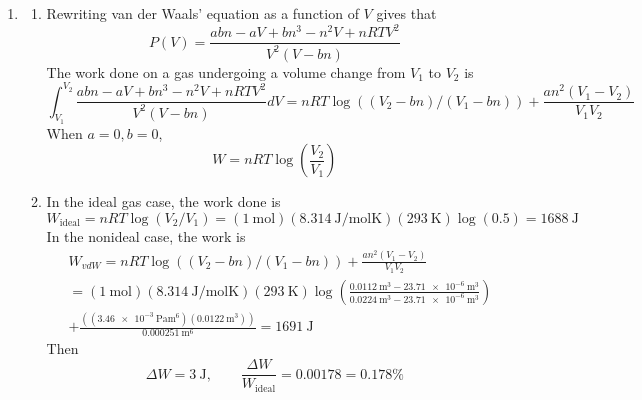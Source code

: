 \documentclass[fleqn]{article}[12pt]
\begin{document}
\begin{enumerate}
    \item \begin{enumerate}
        \item Rewriting van der Waals' equation as a function of $V$ gives that
        \begin{equation*}
            P(V) = \frac{a b n-a V+b n^3-n^2 V+n R T V^2}{V^2 (V-b n)}
        \end{equation*}
        The work done on a gas undergoing a volume change from $V_1$ to $V_2$ is
        \begin{equation*}
            \int_{V_1}^{V_2} \frac{a b n-a V+b n^3-n^2 V+n R T V^2}{V^2 (V-b n)} dV =
            nRT\log((V_2-bn)/(V_1-bn)) + \frac{a n^2 (V_1-V_2)}{V_1 V_2}
        \end{equation*}
        When $a=0,b=0$,
        \begin{equation*}
            W =
            nRT \log\left(\frac{V_2}{V_1}\right)
        \end{equation*}

        \item In the ideal gas case, the work done is
        \begin{equation*}
            W_{\text{ideal}} = n R T \log(V_2/V_1) = (\SI{1}{\mol})(\SI{8.314}{\joule/\mol\kelvin})({\SI{293}{\kelvin}}) \log(0.5) = \SI{1688}{\joule}
        \end{equation*}
        In the nonideal case, the work is
        \begin{align*}
            &W_{vdW} = nRT\log((V_2-bn)/(V_1-bn)) + \frac{a n^2 (V_1-V_2)}{V_1 V_2} \\ &=
            (\SI{1}{\mol})(\SI{8.314}{\joule/\mol\kelvin})({\SI{293}{\kelvin}}) \log\left(
                \frac{\SI{0.0112}{\m^3}-\SI{23.71e-6}{\m^3}}{\SI{0.0224}{\m^3}-\SI{23.71e-6}{\m^3}}
            \right) \\
            &+ \frac{\left((\SI{3.46e-3}{\pascal\m^6})(\SI{0.0122}{\m^3})\right)}{\SI{0.000251}{\m^6}} = \SI{1691}{\joule}
        \end{align*}
        Then
        \begin{equation*}
            \Delta W = \SI{3}{\joule},\qquad  \frac{\Delta W}{W_{\text{ideal}}} = \SI{0.00178} = 0.178\%
        \end{equation*}
    \end{enumerate}
\end{enumerate}
\end{document}
